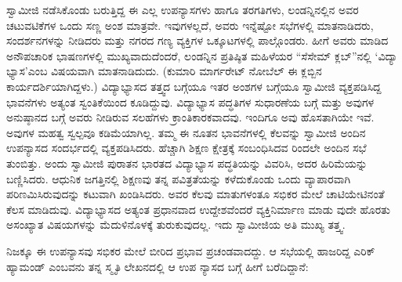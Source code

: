ಸ್ವಾಮೀಜಿ ನಡೆಸಿಕೊಂಡು ಬರುತ್ತಿದ್ದ ಈ ಎಲ್ಲ ಉಪನ್ಯಾಸಗಳು ಹಾಗೂ ತರಗತಿಗಳು, ಲಂಡನ್ನಿನಲ್ಲಿನ ಅವರ ಚಟುವಟಿಕೆಗಳ ಒಂದು ಸಣ್ಣ ಅಂಶ ಮಾತ್ರವೇ. ಇವುಗಳಲ್ಲದೆ, ಅವರು ಇನ್ನೆಷ್ಟೋ ಸಭೆಗಳಲ್ಲಿ ಮಾತನಾಡಿದರು, ಸಂದರ್ಶನಗಳನ್ನು ನೀಡಿದರು ಮತ್ತು ನಗರದ ಗಣ್ಯ ವ್ಯಕ್ತಿಗಳ ಒಕ್ಕೂಟಗಳಲ್ಲಿ ಪಾಲ್ಗೊಂಡರು. ಹೀಗೆ ಅವರು ಮಾಡಿದ ಅನೌಪಚಾರಿಕ ಭಾಷಣಗಳಲ್ಲಿ ಮುಖ್ಯವಾದುದೆಂದರೆ, ಲಂಡನ್ನಿನ ಪ್ರತಿಷ್ಠಿತ ಮಹಿಳೆಯರ “ಸೆಸೇಮ್ ಕ್ಲಬ್​”ನಲ್ಲಿ ‘ವಿದ್ಯಾ ಭ್ಯಾಸ’ಎಂಬ ವಿಷಯವಾಗಿ ಮಾತನಾಡಿದುದು. (ಕುಮಾರಿ ಮಾರ್ಗರೇಟ್ ನೋಬೆಲ್ ಈ ಕ್ಲಬ್ಬಿನ ಕಾರ್ಯದರ್ಶಿಯಾಗಿದ್ದಳು.) ವಿದ್ಯಾಭ್ಯಾಸದ ತತ್ತ್ವದ ಬಗ್ಗೆಯೂ ಇತರ ಅಂಶಗಳ ಬಗ್ಗೆಯೂ ಸ್ವಾಮೀಜಿ ವ್ಯಕ್ತಪಡಿಸಿದ್ದ ಭಾವನೆಗಳು ಅತ್ಯಂತ ಸ್ವಂತಿಕೆಯಿಂದ ಕೂಡಿದ್ದುವು. ವಿದ್ಯಾಭ್ಯಾಸ ಪದ್ಧತಿಗಳ ಸುಧಾರಣೆಯ ಬಗ್ಗೆ ಮತ್ತು ಅವುಗಳ ಅನುಷ್ಠಾನದ ಬಗ್ಗೆ ಅವರು ನೀಡಿರುವ ಸಲಹೆಗಳು ಕ್ರಾಂತಿಕಾರಕವಾದವು. ಇಂದಿಗೂ ಅವು ಹೊಸತಾಗಿಯೇ ಇವೆ. ಅವುಗಳ ಮಹತ್ವ ಸ್ವಲ್ಪವೂ ಕಡಿಮೆಯಾಗಿಲ್ಲ. ತಮ್ಮ ಈ ನೂತನ ಭಾವನೆಗಳಲ್ಲಿ ಕೆಲವನ್ನು ಸ್ವಾಮೀಜಿ ಅಂದಿನ ಉಪನ್ಯಾಸದ ಸಂದರ್ಭದಲ್ಲಿ ವ್ಯಕ್ತಪಡಿಸಿದರು. ಹೆಚ್ಚಾಗಿ ಶಿಕ್ಷಣ ಕ್ಷೇತ್ರಕ್ಕೆ ಸಂಬಂಧಿಸಿದವ ರಿಂದಲೇ ಅಂದಿನ ಸಭೆ ತುಂಬಿತ್ತು. ಅಂದು ಸ್ವಾಮೀಜಿ ಪುರಾತನ ಭಾರತದ ವಿದ್ಯಾಭ್ಯಾಸ ಪದ್ಧತಿಯನ್ನು ವಿವರಿಸಿ, ಅದರ ಹಿರಿಮೆಯನ್ನು ಬಣ್ಣಿಸಿದರು. ಆಧುನಿಕ ಜಗತ್ತಿನಲ್ಲಿ ಶಿಕ್ಷಣವು ತನ್ನ ಪವಿತ್ರತೆಯನ್ನು ಕಳೆದುಕೊಂಡು ಒಂದು ವ್ಯಾಪಾರವಾಗಿ ಪರಿಣಮಿಸಿರುವುದನ್ನು ಕಟುವಾಗಿ ಖಂಡಿಸಿದರು. ಅವರ ಕೆಲವು ಮಾತುಗಳಂತೂ ಸಭಿಕರ ಮೇಲೆ ಚಾಟಿಯೇಟಿನಂತೆ ಕೆಲಸ ಮಾಡಿದುವು. ವಿದ್ಯಾಭ್ಯಾಸದ ಅತ್ಯಂತ ಪ್ರಧಾನವಾದ ಉದ್ದೇಶವೆಂದರೆ ವ್ಯಕ್ತಿನಿರ್ಮಾಣ ಮಾಡು ವುದೇ ಹೊರತು ಅಸಂಖ್ಯಾತ ವಿಷಯಗಳನ್ನು ಮೆದುಳಿನೊಳಕ್ಕೆ ತುರುಕುವುದಲ್ಲ. ಇದು ಸ್ವಾಮೀಜಿಯ ಅತಿ ಮುಖ್ಯ ತತ್ತ್ವ.

ನಿಜಕ್ಕೂ ಈ ಉಪನ್ಯಾಸವು ಸಭಿಕರ ಮೇಲೆ ಬೀರಿದ ಪ್ರಭಾವ ಪ್ರಚಂಡವಾದದ್ದು. ಆ ಸಭೆಯಲ್ಲಿ ಹಾಜರಿದ್ದ ಎರಿಕ್ ಹ್ಯಾಮಂಡ್ ಎಂಬವನು ತನ್ನ ಸ್ಮೃತಿ ಲೇಖನದಲ್ಲಿ ಆ ಉಪ ನ್ಯಾಸದ ಬಗ್ಗೆ ಹೀಗೆ ಬರೆದಿದ್ದಾನೆ:

